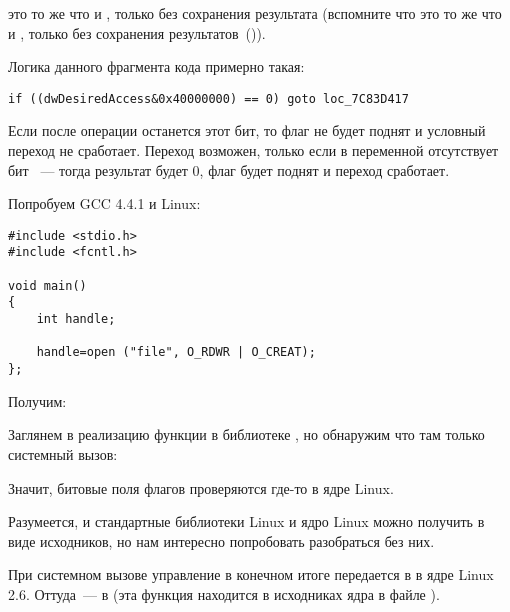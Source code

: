 \TEST это то же что и \AND, только без сохранения результата 
(вспомните что \CMP это то же что и \SUB, только без сохранения результатов~()).

Логика данного фрагмента кода примерно такая:

\begin{lstlisting}[style=customc]
if ((dwDesiredAccess&0x40000000) == 0) goto loc_7C83D417
\end{lstlisting}

Если после операции \AND останется этот бит, то флаг \ZF не будет поднят и условный переход 
\JZ не сработает. 
Переход возможен, только если в переменной  отсутствует бит ~--- 
тогда результат \AND будет 0, флаг \ZF будет поднят и переход сработает.

Попробуем GCC 4.4.1 и Linux:

\begin{lstlisting}[style=customc]
#include <stdio.h>
#include <fcntl.h>

void main()
{
	int handle;

	handle=open ("file", O_RDWR | O_CREAT);
};
\end{lstlisting}

Получим:



Заглянем в реализацию функции  в библиотеке , но обнаружим что там 
только системный вызов:



Значит, битовые поля флагов  проверяются где-то в ядре Linux.

Разумеется, и стандартные библиотеки Linux и ядро Linux можно получить в виде исходников, 
но нам интересно попробовать разобраться без них.

При системном вызове  управление в конечном итоге передается в  в ядре Linux 2.6. 
Оттуда~--- в  (эта функция находится в исходниках ядра в файле ).

\newcommand{\URLREGPARM}{\href{http://www.ohse.de/uwe/articles/gcc-attributes.html\#func-regparm}{ohse.de/uwe/articles/gcc-attributes.html\#func-regparm}}

